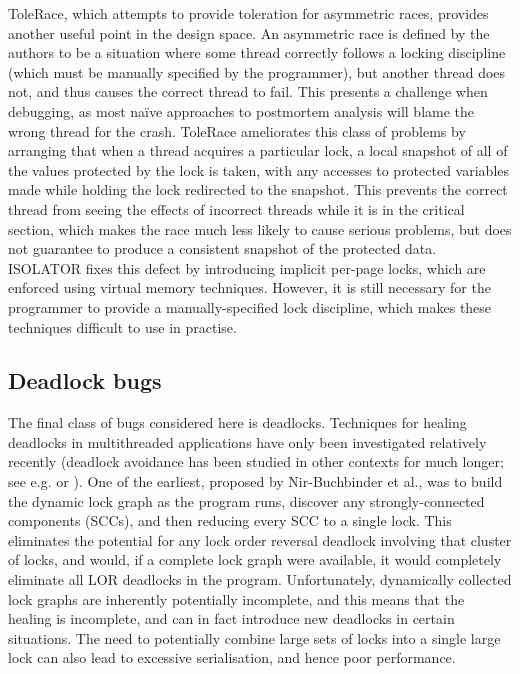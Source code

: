 ToleRace\cite{Kirovski2007}, which attempts to provide toleration for
asymmetric races, provides another useful point in the design space.
An asymmetric race is defined by the authors to be a situation where
some thread correctly follows a locking discipline (which must be
manually specified by the programmer), but another thread does not,
and thus causes the correct thread to fail.  This presents a challenge
when debugging, as most na\"{i}ve approaches to postmortem analysis
will blame the wrong thread for the crash.  ToleRace ameliorates this
class of problems by arranging that when a thread acquires a
particular lock, a local snapshot of all of the values protected by
the lock is taken, with any accesses to protected variables made while
holding the lock redirected to the snapshot.  This prevents the
correct thread from seeing the effects of incorrect threads while it
is in the critical section, which makes the race much less likely to
cause serious problems, but does not guarantee to produce a consistent
snapshot of the protected data.  ISOLATOR\cite{Ramalingam2009} fixes
this defect by introducing implicit per-page locks, which are enforced
using virtual memory techniques.  However, it is still necessary for
the programmer to provide a manually-specified lock discipline, which
makes these techniques difficult to use in practise.

\subsection{Deadlock bugs}
The final class of bugs considered here is deadlocks.  Techniques for
healing deadlocks in multithreaded applications have only been
investigated relatively recently (deadlock avoidance has been studied
in other contexts for much longer; see e.g. \cite{Viswanadham1990} or
\cite{Dijkstra2004}).  One of the earliest, proposed by Nir-Buchbinder
et al.\cite{Nir-Buchbinder2008}, was to build the dynamic lock graph
as the program runs, discover any strongly-connected components
(SCCs), and then reducing every SCC to a single lock.  This eliminates
the potential for any lock order reversal deadlock involving that
cluster of locks, and would, if a complete lock graph were available,
it would completely eliminate all LOR deadlocks in the program.
Unfortunately, dynamically collected lock graphs are inherently
potentially incomplete, and this means that the healing is incomplete,
and can in fact introduce new deadlocks in certain situations.  The
need to potentially combine large sets of locks into a single large
lock can also lead to excessive serialisation, and hence poor
performance.

